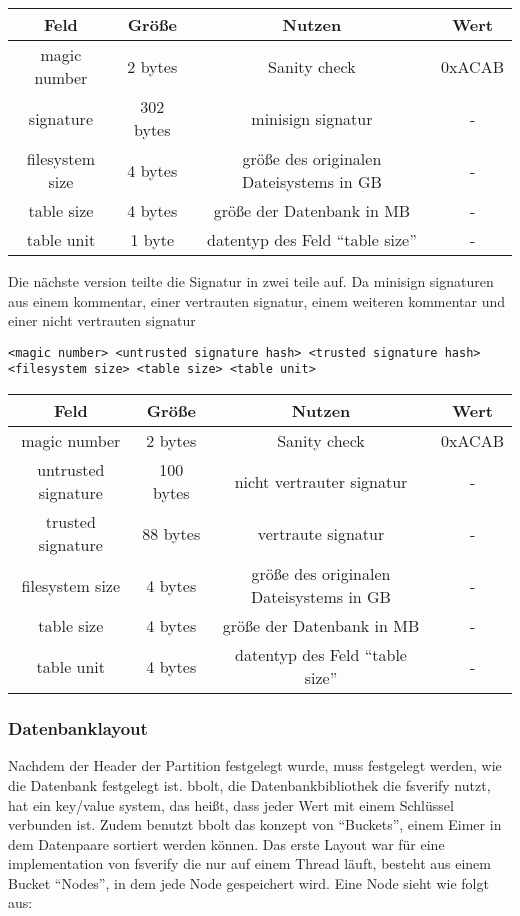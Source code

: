 \begin{center}
  \begin{tabular}{|c | c | c | c|}
    \hline
    Feld & Größe & Nutzen & Wert \\ [0.5ex]
    \hline
    magic number & 2 bytes & Sanity check & 0xACAB \\
    \hline
    signature & 302 bytes & minisign signatur & - \\
    \hline
    filesystem size & 4 bytes & größe des originalen Dateisystems in GB & - \\
    \hline
    table size & 4 bytes & größe der Datenbank in MB & - \\
    \hline
    table unit & 1 byte & datentyp des Feld ``table size'' & - \\
    \hline
  \end{tabular}
\end{center}
\hfill \break
Die nächste version teilte die Signatur in zwei teile auf. Da minisign signaturen aus einem kommentar, einer vertrauten signatur, einem weiteren kommentar und einer nicht vertrauten signatur
\begin{verbatim}
<magic number> <untrusted signature hash> <trusted signature hash>
<filesystem size> <table size> <table unit>
\end{verbatim}

\begin{center}
  \begin{tabular}{|c | c | c | c|}
    \hline
    Feld & Größe & Nutzen & Wert \\ [0.5ex]
    \hline
    magic number & 2 bytes & Sanity check & 0xACAB \\
    \hline
    untrusted signature & 100 bytes & nicht vertrauter signatur & - \\
    \hline
    trusted signature & 88 bytes & vertraute signatur & - \\
    \hline
    filesystem size & 4 bytes & größe des originalen Dateisystems in GB & - \\
    \hline
    table size & 4 bytes & größe der Datenbank in MB & - \\
    \hline
    table unit & 4 bytes & datentyp des Feld ``table size'' & - \\
    \hline
  \end{tabular}
\end{center}

\subsubsection{Datenbanklayout}
Nachdem der Header der Partition festgelegt wurde, muss festgelegt werden, wie die Datenbank festgelegt ist.
bbolt, die Datenbankbibliothek die fsverify nutzt, hat ein key/value system, das heißt, dass jeder Wert mit einem Schlüssel verbunden ist. Zudem benutzt bbolt das konzept von ``Buckets'', einem Eimer in dem Datenpaare sortiert werden können.
\bigbreak \noindent
Das erste Layout war für eine implementation von fsverify die nur auf einem Thread läuft, besteht aus einem Bucket ``Nodes'', in dem jede Node gespeichert wird.
Eine Node sieht wie folgt aus:

